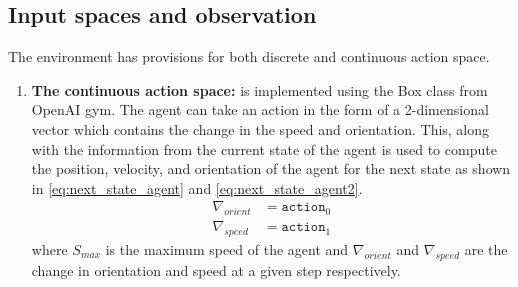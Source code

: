 \subsection{Input spaces and observation}
\label{subsec:action-space}
The environment has provisions for both discrete and continuous action space.
\begin{enumerate}
    \item \textbf{The continuous action space:} is implemented using the Box class from OpenAI gym. The agent can take an action in the form of a 2-dimensional vector which contains the change in the speed and orientation. This, along with the information from the current state of the agent is used to compute the position, velocity, and orientation of the agent for the next state as shown in \autoref{eq:next_state_agent} and \autoref{eq:next_state_agent2}.\\
   \begin{align}
	\nabla_{orient} & = \texttt{action}_{0}\\
	\nabla_{speed} & = \texttt{action}_{1}
	\end{align}
    where $S_{max}$ is the maximum speed of the agent and $\nabla_{orient}$ and $\nabla_{speed}$ are the change in orientation and speed at a given step respectively.
    

\end{enumerate}
